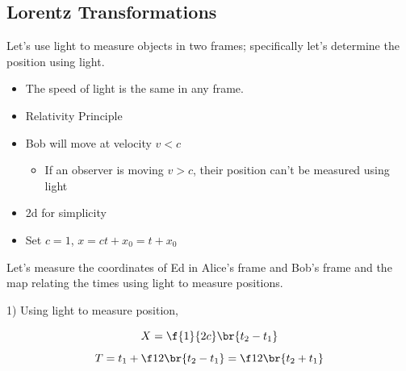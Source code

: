 \documentclass{article}
\begin{document}
\subsection{Lorentz Transformations}

Let's use light to measure objects in two frames; specifically let's determine the position using light.


\begin{itemize}
    \item The speed of light is the same in any frame.
    \item Relativity Principle
    \item Bob will move at velocity $v < c$
    \begin{itemize}
        \item If an observer is moving $v > c$, their position can't be measured using light
    \end{itemize}
    \item 2d for simplicity
    \item Set $c=1$, $x=ct + x_0 = t + x_0$
\end{itemize}

\begin{center}
\end{center}

Let's measure the coordinates of Ed in Alice's frame and Bob's frame and the map relating the times using light to measure positions.

1) Using light to measure position,

\[ X = \f{1}{2c}\br{t_2 - t_1} \]
\[ T = t_1 + \f12 \br{t_2 - t_1} = \f12 \br{t_2 + t_1} \]
\end{document}
